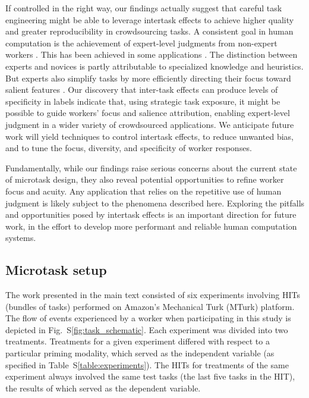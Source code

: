 \documentclass{pnastwo}
\begin{document}
\begin{article}
If controlled in the right way, our findings actually suggest that careful task
engineering might be able to leverage intertask effects to achieve higher 
quality and greater reproducibility in crowdsourcing tasks.  A consistent goal
in human computation is the achievement of expert-level judgments from
non-expert workers \cite{kittur2011crowdforge}.  This has been achieved in some
applications \cite{snow2008cheap,Mortensen20131020,Warby2014385}.  The
distinction between experts and novices is partly attributable to specialized
knowledge and heuristics.  But experts also simplify tasks by more efficiently
directing their focus toward salient features \cite{kellman2009perceptual}.
Our discovery that inter-task effects can produce levels of specificity in
labels indicate that, using strategic task exposure, it might be possible to
guide workers' focus and salience attribution, enabling expert-level judgment
in a wider variety of crowdsourced applications.  We anticipate future work
will yield techniques to control intertask effects, to reduce unwanted bias,
and to tune the focus, diversity, and specificity of worker responses.

Fundamentally, while our findings raise serious concerns about the current
state of microtask design, they also reveal potential opportunities to refine
worker focus and acuity.  Any application that relies on the repetitive use of
human judgment is likely subject to the phenomena described here.  Exploring
the pitfalls and opportunities posed by intertask effects is an important
direction for future work, in the effort to develop more performant and
reliable human computation systems.

\begin{materials}

\section{Microtask setup} The work presented in the main text consisted of six
experiments involving HITs (bundles of tasks) performed on Amazon's Mechanical
Turk (MTurk) platform.  The flow of events experienced by a worker when
participating in this study is depicted in Fig.~S\ref{fig:task_schematic}.
Each experiment was divided into two treatments.  Treatments for a given
experiment differed with respect to a particular priming modality, which served
as the independent variable (as specified in Table~S\ref{table:experiments}).
The HITs for treatments of the same experiment always involved the same test
tasks (the last five tasks in the HIT), the results of which served as the
dependent variable.


\end{materials}
\end{article}
\end{document}
